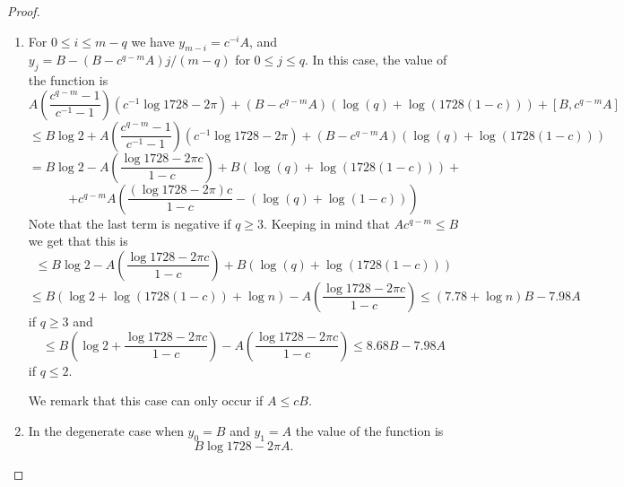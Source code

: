 \documentclass[12pt]{amsart}
\theoremstyle{plain} %
\theoremstyle{definition}
\theoremstyle{remark}
\numberwithin{equation}{section}
\begin{document}
\begin{proof}
\begin{enumerate}
\item For $0\leq i\leq m-q$ we have $y_{m-i}=c^{-i}A$, and $y_j=B-(B-c^{q-m}A)j/(m-q)$ for $0\leq j\leq q$. In this case, the
value of the function is
\[A \left(\frac{c^{q-m}-1}{c^{-1}-1}\right)\left(c^{-1}\log
1728-2\pi\right)+(B-c^{q-m}A)(\log(q)+\log(1728(1-c)))+\left[B,c^{q-m}A\right]\]
\[\leq B\log 2 + A \left(\frac{c^{q-m}-1}{c^{-1}-1}\right)\left(c^{-1}\log
1728-2\pi\right)+(B-c^{q-m}A)(\log(q)+\log(1728(1-c)))\]
\[= B\log 2 - A \left(\frac{\log
  1728-2\pi c}{1-c}\right)+B(\log(q)+\log(1728(1-c)))+\]
\[+c^{q-m}A\left(\frac{(\log
1728-2\pi) c}{1-c}-(\log(q)+\log(1-c))\right)\]
Note that the last term is negative if $q\geq 3$. Keeping in
mind that $Ac^{q-m}\leq B$ we get that this is
\[\leq B\log 2 - A \left(\frac{\log
1728-2\pi c}{1-c}\right)+B(\log(q)+\log(1728(1-c)))\]
\[\leq B\left(\log 2 +\log(1728(1-c))+\log n\right)- A \left(\frac{\log
1728-2\pi c}{1-c}\right)\leq (7.78+\log n)B-7.98A\]
if $q\geq 3$ and 
\[\leq B\left(\log 2+\frac{\log
1728-2\pi c}{1-c}\right) - A \left(\frac{\log
1728-2\pi c}{1-c}\right)\leq 8.68B -7.98A\]
if $q\leq 2$. 


We remark that this case can only occur if $A\leq cB$.
\item In the degenerate case when $y_0=B$ and $y_1=A$ the value
of the function is
\[B\log 1728-2\pi A.\]
\end{enumerate}


\end{proof}
\end{document}
